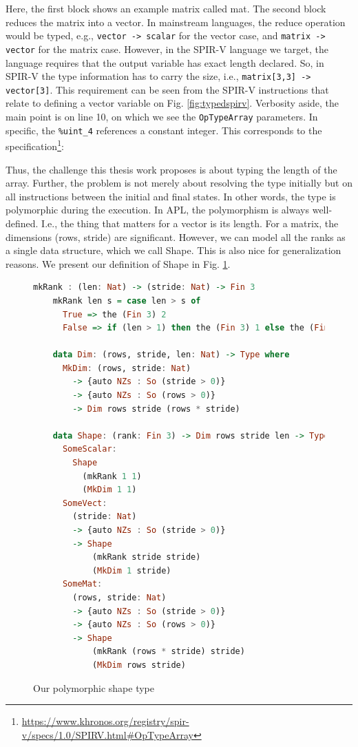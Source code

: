 \documentclass{report}
\begin{document}
Here, the first block shows an example matrix called mat. The second block reduces the matrix into a vector. In mainstream languages, the reduce operation would be typed, e.g., \verb|vector -> scalar| for the vector case, and \verb|matrix -> vector| for the matrix case. However, in the SPIR-V language we target, the language requires that the output variable has exact length declared. So, in SPIR-V the type information has to carry the size, i.e., \verb|matrix[3,3] -> vector[3]|. This requirement can be seen from the SPIR-V instructions that relate to defining a vector variable on Fig. \ref{fig:typedspirv}. Verbosity aside, the main point is on line 10, on which we see the \verb|OpTypeArray| parameters. In specific, the \verb|%uint_4| references a constant integer. This corresponds to the specification\footnote{ \url{https://www.khronos.org/registry/spir-v/specs/1.0/SPIRV.html#OpTypeArray}}: 

Thus, the challenge this thesis work proposes is about typing the length of the array. Further, the problem is not merely about resolving the type initially but on all instructions between the initial and final states. In other words, the type is polymorphic during the execution. In APL, the polymorphism is always well-defined. I.e., the thing that matters for a vector is its length. For a matrix, the dimensions (rows, stride) are significant. However, we can model all the ranks as a single data structure, which we call Shape. This is also nice for generalization reasons. We present our definition of Shape in Fig. \ref{fig:shape}.

\begin{figure}
\begin{lstlisting}[language=Haskell]
    mkRank : (len: Nat) -> (stride: Nat) -> Fin 3
    mkRank len s = case len > s of
      True => the (Fin 3) 2
      False => if (len > 1) then the (Fin 3) 1 else the (Fin 3) 0
    
    data Dim: (rows, stride, len: Nat) -> Type where
      MkDim: (rows, stride: Nat)
        -> {auto NZs : So (stride > 0)}
        -> {auto NZs : So (rows > 0)}
        -> Dim rows stride (rows * stride)
    
    data Shape: (rank: Fin 3) -> Dim rows stride len -> Type where
      SomeScalar:
        Shape
          (mkRank 1 1)
          (MkDim 1 1)
      SomeVect:
        (stride: Nat)
        -> {auto NZs : So (stride > 0)}
        -> Shape
            (mkRank stride stride)
            (MkDim 1 stride)
      SomeMat:
        (rows, stride: Nat)
        -> {auto NZs : So (stride > 0)}
        -> {auto NZs : So (rows > 0)}
        -> Shape
            (mkRank (rows * stride) stride)
            (MkDim rows stride)
\end{lstlisting}    
\caption{Our polymorphic shape type}
\label{fig:shape}
\end{figure}
        
\end{document}
